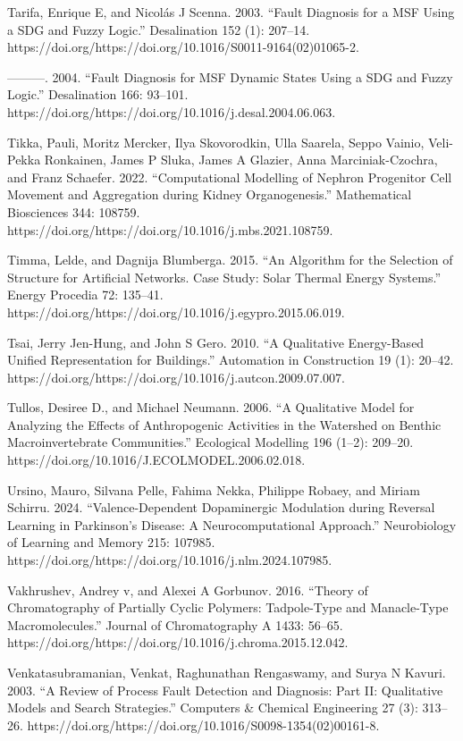 \documentclass[utf8]{gradu3}
\begin{document}
Tarifa, Enrique E, and Nicolás J Scenna. 2003. “Fault Diagnosis for a MSF Using a SDG and Fuzzy Logic.” Desalination 152 (1): 207–14. https://doi.org/https://doi.org/10.1016/S0011-9164(02)01065-2.

———. 2004. “Fault Diagnosis for MSF Dynamic States Using a SDG and Fuzzy Logic.” Desalination 166: 93–101. https://doi.org/https://doi.org/10.1016/j.desal.2004.06.063.

Tikka, Pauli, Moritz Mercker, Ilya Skovorodkin, Ulla Saarela, Seppo Vainio, Veli-Pekka Ronkainen, James P Sluka, James A Glazier, Anna Marciniak-Czochra, and Franz Schaefer. 2022. “Computational Modelling of Nephron Progenitor Cell Movement and Aggregation during Kidney Organogenesis.” Mathematical Biosciences 344: 108759. https://doi.org/https://doi.org/10.1016/j.mbs.2021.108759.

Timma, Lelde, and Dagnija Blumberga. 2015. “An Algorithm for the Selection of Structure for Artificial Networks. Case Study: Solar Thermal Energy Systems.” Energy Procedia 72: 135–41. https://doi.org/https://doi.org/10.1016/j.egypro.2015.06.019.

Tsai, Jerry Jen-Hung, and John S Gero. 2010. “A Qualitative Energy-Based Unified Representation for Buildings.” Automation in Construction 19 (1): 20–42. https://doi.org/https://doi.org/10.1016/j.autcon.2009.07.007.

Tullos, Desiree D., and Michael Neumann. 2006. “A Qualitative Model for Analyzing the Effects of Anthropogenic Activities in the Watershed on Benthic Macroinvertebrate Communities.” Ecological Modelling 196 (1–2): 209–20. https://doi.org/10.1016/J.ECOLMODEL.2006.02.018.

Ursino, Mauro, Silvana Pelle, Fahima Nekka, Philippe Robaey, and Miriam Schirru. 2024. “Valence-Dependent Dopaminergic Modulation during Reversal Learning in Parkinson’s Disease: A Neurocomputational Approach.” Neurobiology of Learning and Memory 215: 107985. https://doi.org/https://doi.org/10.1016/j.nlm.2024.107985.

Vakhrushev, Andrey v, and Alexei A Gorbunov. 2016. “Theory of Chromatography of Partially Cyclic Polymers: Tadpole-Type and Manacle-Type Macromolecules.” Journal of Chromatography A 1433: 56–65. https://doi.org/https://doi.org/10.1016/j.chroma.2015.12.042.

Venkatasubramanian, Venkat, Raghunathan Rengaswamy, and Surya N Kavuri. 2003. “A Review of Process Fault Detection and Diagnosis: Part II: Qualitative Models and Search Strategies.” Computers \& Chemical Engineering 27 (3): 313–26. https://doi.org/https://doi.org/10.1016/S0098-1354(02)00161-8.
\end{document}

